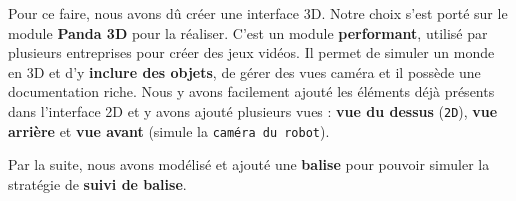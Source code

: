 \documentclass[12pt]{article}
\begin{document}
\hspace{\parindent}Pour ce faire, nous avons dû créer une interface 3D. Notre choix s'est porté sur le module \textbf{Panda 3D} pour la réaliser. C’est un module \textbf{performant}, utilisé par plusieurs entreprises pour créer des jeux vidéos. Il permet de simuler un monde en 3D et d’y \textbf{inclure des objets}, de gérer des vues caméra et il possède une documentation riche. Nous y avons facilement ajouté les éléments déjà présents dans l'interface 2D et y avons ajouté plusieurs vues : \textbf{vue du dessus} (\texttt{2D}), \textbf{vue arrière} et \textbf{vue avant} (simule la \texttt{caméra du robot}).

\hspace{\parindent}Par la suite, nous avons modélisé et ajouté une \textbf{balise} pour pouvoir simuler la stratégie de \textbf{suivi de balise}.
\end{document}
